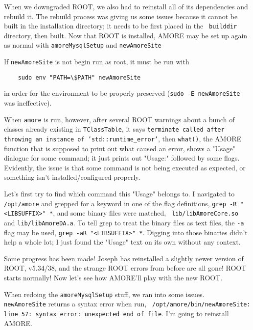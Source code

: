 \documentclass[12pt]{article}
\begin{document}
\qq When we downgraded ROOT, we also had to reinstall all of its dependencies
and rebuild it. The rebuild process was giving us some issues because it cannot
be built in the installation directory; it needs to be first placed in the {\tt
  builddir} directory, then built. Now that ROOT is installed, AMORE may be set
up again as normal with {\tt amoreMysqlSetup} and {\tt newAmoreSite} 

\begin{tcolorbox}[title=NOTE, colback=white, colframe=blue]
  If {\tt newAmoreSite} is not begin run as root, it must be run with

  \begin{verbatim}
    sudo env "PATH=\$PATH" newAmoreSite
  \end{verbatim}
  
  in order for the environment to be
  properly preserved ({\tt sudo -E newAmoreSite} was ineffective).
\end{tcolorbox}

\qq When {\tt amore} is run, however, after several ROOT warnings about a bunch
of classes already existing in {\tt TClassTable}, it says {\tt terminate called
  after throwing an instance of 'std::runtime\_error'}, then {\tt what()}, the
AMORE function that is supposed to print out what caused an error, shows a
"Usage" dialogue for some command; it just prints out "Usage:" followed by
some flags. Evidently, the issue is that some command
is not being executed as expected, or something isn't installed/configured
properly.

\qq Let's first try to find which command this "Usage" belongs to. I navigated
to {\tt /opt/amore} and grepped for a keyword in one of the flag definitions,
{\tt grep -R "<LIBSUFFIX>" *}, and some binary files were matched, {\tt
  lib/libAmoreCore.so} and {\tt lib/libAmoreDA.a}. To tell grep to treat the
binary files as text files, the {\tt -a} flag may be used, {\tt grep -aR
  "<LIBSUFFIX>" *}. Digging into those binaries didn't help a whole lot; I
just found the "Usage" text on its own without any context.

\qq Some progress has been made! Joseph has reinstalled a slightly newer version
of ROOT, v5.34/38, and the strange ROOT errors from before are all gone! ROOT
starts normally! Now let's see how AMORE'll play with the new ROOT.

\qq When redoing the {\tt amoreMysqlSetup} stuff, we ran into some issues. {\tt
  newAmoreSite} returns a syntax error when run, {\tt
  /opt/amore/bin/newAmoreSite: line 57: syntax error: unexpected end of file}.
I'm going to reinstall AMORE.
\end{document}
